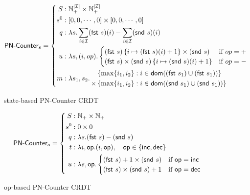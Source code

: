 \begin{figure}[H]
  \[
    \textsf{PN-Counter}_s = \left\{\begin{aligned}
      S &: \mathbb{N}_+^{|\mathcal{I}|} \times \mathbb{N}_+^{|\mathcal{I}|} \\
      s^0 &: \left[ 0, 0, \cdots, 0 \right] \times \left[ 0, 0, \cdots, 0 \right] \\
      q &: \lambda s. \sum_{i \in \mathcal{I}} (\textsf{fst}~s)(i) - \sum_{i \in
        \mathcal{I}} (\textsf{snd}~s)(i) \\
      u &: \lambda s,(i,op). \begin{cases}
             (\textsf{fst}~s)\left\{ i \mapsto (\textsf{fst}~s)(i) + 1 \right\} \times (\textsf{snd}~s) & \text{if $op=+$} \\
             (\textsf{fst}~s) \times (\textsf{snd}~s)\left\{ i \mapsto (\textsf{snd}~s)(i) + 1 \right\} & \text{if $op=-$} \\
           \end{cases} \\
      m &: \lambda s_1, s_2.\, \begin{aligned}
             &\left\{ \max\{ i_1, i_2 \} : i \in \mathsf{dom}((\textsf{fst}~s_1) \cup (\textsf{fst}~s_1)) \right\} \\
             \times &\left\{ \max\{ i_1, i_2 \} : i \in \mathsf{dom}((\textsf{snd}~s_1) \cup (\textsf{snd}~s_1)) \right\}
           \end{aligned}
    \end{aligned}\right.
  \]
  \caption{state-based \textsf{PN-Counter} CRDT}
\end{figure}

\begin{figure}[H]
  \centering
  \[
    \textsf{PN-Counter}_o = \left\{\begin{aligned}
      S &: \mathbb{N}_+ \times \mathbb{N}_+  \\
      s^0 &: 0 \times 0 \\
      q &: \lambda s. (\textsf{fst}~s) - (\textsf{snd}~s) \\
      t &: \lambda i, \mathsf{op}. (i, \mathsf{op}),\quad \mathsf{op} \in \{
        \mathsf{inc}, \mathsf{dec} \} \\
      u &: \lambda s,\mathsf{op}. \begin{cases}
             (\textsf{fst}~s) + 1 \times (\textsf{snd}~s) & \text{if $\mathsf{op} = \mathsf{inc}$} \\
             (\textsf{fst}~s) \times (\textsf{snd}~s) + 1 & \text{if $\mathsf{op} = \mathsf{dec}$} \\
           \end{cases} \\
    \end{aligned}\right.
  \]
  \caption{op-based \textsf{PN-Counter} CRDT}
\end{figure}

